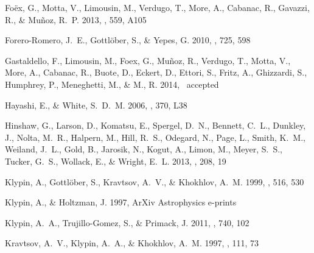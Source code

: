 \documentclass{emulateapj}
\begin{document}
\begin{thebibliography}{24}
{Fo{\"e}x}, G., {Motta}, V., {Limousin}, M., {Verdugo}, T., {More}, A.,
  {Cabanac}, R., {Gavazzi}, R., \& {Mu{\~n}oz}, R.~P. 2013, \aap, 559, A105

{Forero-Romero}, J.~E., {Gottl{\"o}ber}, S., \& {Yepes}, G. 2010, \apj, 725,
  598

{Gastaldello}, F., {Limousin}, M., {Foex}, G., {Mu\~noz}, R., {Verdugo}, T.,
  {Motta}, V., {More}, A., {Cabanac}, R., {Buote}, D., {Eckert}, D., {Ettori},
  S., {Fritz}, A., {Ghizzardi}, S., {Humphrey}, P., {Meneghetti}, M., \& M., R.
  2014, \mnras\ accepted

{Hayashi}, E., \& {White}, S.~D.~M. 2006, \mnras, 370, L38

{Hinshaw}, G., {Larson}, D., {Komatsu}, E., {Spergel}, D.~N., {Bennett}, C.~L.,
  {Dunkley}, J., {Nolta}, M.~R., {Halpern}, M., {Hill}, R.~S., {Odegard}, N.,
  {Page}, L., {Smith}, K.~M., {Weiland}, J.~L., {Gold}, B., {Jarosik}, N.,
  {Kogut}, A., {Limon}, M., {Meyer}, S.~S., {Tucker}, G.~S., {Wollack}, E., \&
  {Wright}, E.~L. 2013, \apjs, 208, 19

{Klypin}, A., {Gottl{\"o}ber}, S., {Kravtsov}, A.~V., \& {Khokhlov}, A.~M.
  1999, \apj, 516, 530

{Klypin}, A., \& {Holtzman}, J. 1997, ArXiv Astrophysics e-prints

{Klypin}, A.~A., {Trujillo-Gomez}, S., \& {Primack}, J. 2011, \apj, 740, 102

{Kravtsov}, A.~V., {Klypin}, A.~A., \& {Khokhlov}, A.~M. 1997, \apjs, 111, 73


\end{thebibliography}
\end{document}
